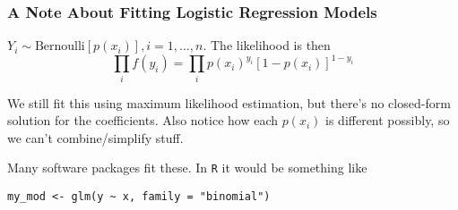 \documentclass{beamer}
\begin{document}
\begin{frame}[fragile]
\frametitle{A Note About Fitting Logistic Regression Models}

$Y_i \sim \text{Bernoulli}[p(x_i)], i=1,\ldots,n$. The likelihood is then
\[
\prod_i f(y_i) = \prod_i p(x_i)^{y_i}[1-p(x_i)]^{1 - y_i}
\]

We still fit this using maximum likelihood estimation, but there's no closed-form solution for the coefficients. Also notice how each $p(x_i)$ is different possibly, so we can't combine/simplify stuff.
\newline

Many software packages fit these. In \verb|R| it would be something like 

\begin{verbatim} 
my_mod <- glm(y ~ x, family = "binomial")
\end{verbatim}


\end{frame}
\end{document}
